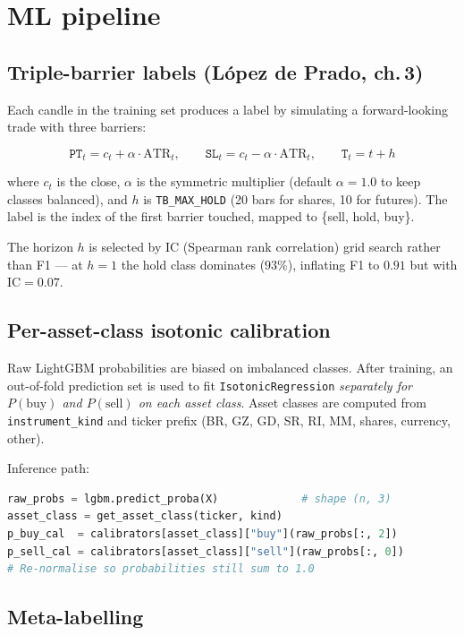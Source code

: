 \documentclass[11pt,a4paper]{article}
\begin{document}
\newpage
\section{ML pipeline}

\subsection{Triple-barrier labels (López de Prado, ch.\,3)}

Each candle in the training set produces a label by simulating a
forward-looking trade with three barriers:

\[
\texttt{PT}_t = c_t + \alpha \cdot \mathrm{ATR}_t,\qquad
\texttt{SL}_t = c_t - \alpha \cdot \mathrm{ATR}_t,\qquad
\texttt{T}_t = t + h
\]

where $c_t$ is the close, $\alpha$ is the symmetric multiplier (default
$\alpha = 1.0$ to keep classes balanced), and $h$ is
\texttt{TB\_MAX\_HOLD} (20 bars for shares, 10 for futures). The label
is the index of the first barrier touched, mapped to
\{sell, hold, buy\}.

The horizon $h$ is selected by IC (Spearman rank correlation) grid
search rather than F1 — at $h{=}1$ the hold class dominates ($93\%$),
inflating F1 to $0.91$ but with $\mathrm{IC}=0.07$.

\subsection{Per-asset-class isotonic calibration}

Raw LightGBM probabilities are biased on imbalanced classes. After
training, an out-of-fold prediction set is used to fit
\texttt{IsotonicRegression} \emph{separately for $P(\text{buy})$ and
$P(\text{sell})$ on each asset class}. Asset classes are computed from
\texttt{instrument\_kind} and ticker prefix (BR, GZ, GD, SR, RI, MM,
shares, currency, other).

Inference path:

\begin{lstlisting}[language=Python]
raw_probs = lgbm.predict_proba(X)             # shape (n, 3)
asset_class = get_asset_class(ticker, kind)
p_buy_cal  = calibrators[asset_class]["buy"](raw_probs[:, 2])
p_sell_cal = calibrators[asset_class]["sell"](raw_probs[:, 0])
# Re-normalise so probabilities still sum to 1.0
\end{lstlisting}

\subsection{Meta-labelling}
\end{document}
